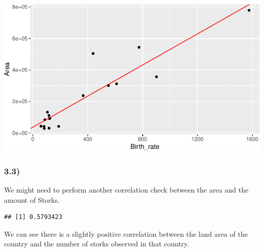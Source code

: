 \documentclass[
]{article}
\newenvironment{Shaded}{\begin{snugshade}}{\end{snugshade}}
\newcommand{\AttributeTok}[1]{\textcolor[rgb]{0.77,0.63,0.00}{#1}}
\newcommand{\DecValTok}[1]{\textcolor[rgb]{0.00,0.00,0.81}{#1}}
\newcommand{\FunctionTok}[1]{\textcolor[rgb]{0.00,0.00,0.00}{#1}}
\newcommand{\NormalTok}[1]{#1}
\newcommand{\OtherTok}[1]{\textcolor[rgb]{0.56,0.35,0.01}{#1}}
\newcommand{\SpecialCharTok}[1]{\textcolor[rgb]{0.00,0.00,0.00}{#1}}
\newcommand{\StringTok}[1]{\textcolor[rgb]{0.31,0.60,0.02}{#1}}
\begin{document}
\begin{center}\includegraphics{Homework7_files/figure-latex/unnamed-chunk-18-1} \end{center}

\hypertarget{section-11}{%
\subsubsection{3.3)}\label{section-11}}

We might need to perform another correlation check between the area and
the amount of Storks.

\begin{Shaded}
\end{Shaded}

\begin{verbatim}
## [1] 0.5793423
\end{verbatim}

We can see there is a slightly positive correlation between the land
area of the country and the number of storks observed in that country.

\begin{Shaded}
\end{Shaded}
\end{document}
